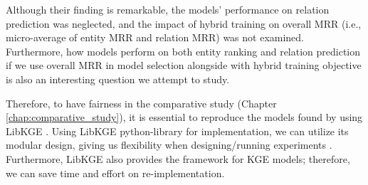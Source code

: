 \begin{table}[!htbp]
\centering
{}
\caption[The performance of ComplEx models on test data.]{The performance of ComplEx models in Entity Ranking on Test data. The results are taken from \citep{chen2021relation}'s paper.}
\label{tab:AKBC results}
\end{table}



Although their finding is remarkable, the models' performance on relation prediction was neglected, and the impact of hybrid training on overall MRR (i.e., micro-average of entity MRR and relation MRR) was not examined. Furthermore, how models perform on both entity ranking and relation prediction if we use overall MRR in model selection alongside with hybrid training objective is also an interesting question we attempt to study. 

Therefore, to have fairness in the comparative study (Chapter \ref{chap:comparative_study}), it is essential to reproduce the models found by \citet{chen2021relation} using LibKGE \citep{libkge}. Using LibKGE python-library \citep{libkge} for implementation, we can utilize its modular design, giving us flexibility when designing/running experiments \citep{Ruffinelli2020You}. Furthermore, LibKGE also provides the framework for KGE models; therefore, we can save time and effort on re-implementation.

